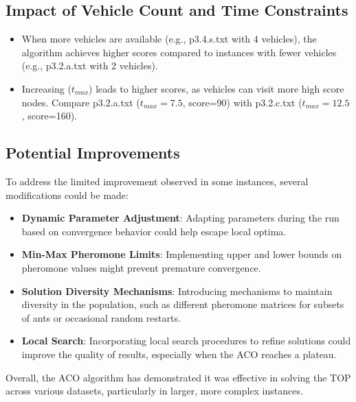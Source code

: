 \documentclass[a4paper,12pt]{article}
\begin{document}
\subsection{Impact of Vehicle Count and Time Constraints}

\begin{itemize}
    \item When more vehicles are available (e.g., p3.4.s.txt with 4 vehicles), the algorithm achieves higher scores compared to instances with fewer vehicles (e.g., p3.2.a.txt with 2 vehicles).
    \item Increasing ($t_{max}$) leads to higher scores, as vehicles can visit more high score nodes. Compare p3.2.a.txt ($t_{max}=7.5$, score=90) with p3.2.c.txt ($t_{max}=12.5$, score=160).
\end{itemize}

\subsection{Potential Improvements}

To address the limited improvement observed in some instances, several modifications could be made:

\begin{itemize}
    \item \textbf{Dynamic Parameter Adjustment}: Adapting parameters during the run based on convergence behavior could help escape local optima.
    
    \item \textbf{Min-Max Pheromone Limits}: Implementing upper and lower bounds on pheromone values might prevent premature convergence.
    
    \item \textbf{Solution Diversity Mechanisms}: Introducing mechanisms to maintain diversity in the population, such as different pheromone matrices for subsets of ants or occasional random restarts.
    
    \item \textbf{Local Search}: Incorporating local search procedures to refine solutions could improve the quality of results, especially when the ACO reaches a plateau.
\end{itemize}

Overall, the ACO algorithm has demonstrated it was effective in solving the TOP across various datasets, particularly in larger, more complex instances.
\end{document}

